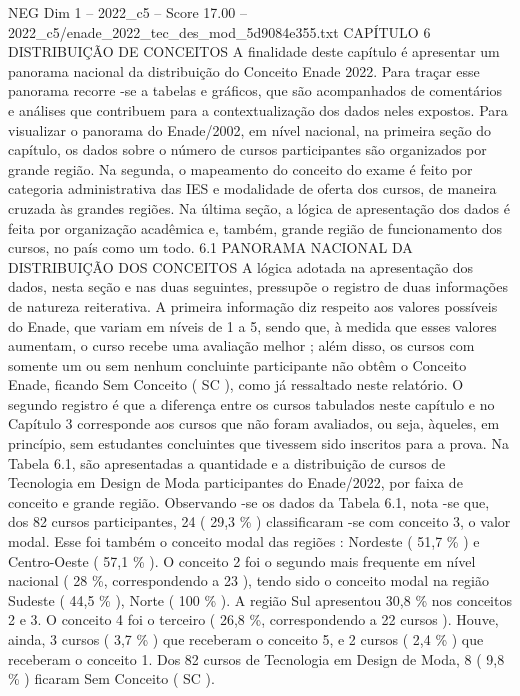 \begin{textsample}{NEG Dim 1 – 2022\_c5 – Score 17.00 – 2022\_c5/enade\_2022\_tec\_des\_mod\_5d9084e355.txt}  \label{ex:f1_neg_415}
CAPÍTULO 6 DISTRIBUIÇÃO DE CONCEITOS A finalidade deste capítulo é apresentar um panorama nacional da distribuição do Conceito Enade 2022.
Para traçar esse panorama recorre -se a tabelas e gráficos, que são acompanhados de comentários e análises que contribuem para a contextualização dos dados neles expostos.
Para visualizar o panorama do Enade/2002, em nível nacional, na primeira seção do capítulo, os dados sobre o número de cursos participantes são organizados por grande região.
Na segunda, o mapeamento do conceito do exame é feito por categoria administrativa das IES e modalidade de oferta dos cursos, de maneira cruzada às grandes regiões.
Na última seção, a lógica de apresentação dos dados é feita por organização acadêmica e, também, grande região de funcionamento dos cursos, no país como um todo. 6.1 PANORAMA NACIONAL DA DISTRIBUIÇÃO DOS CONCEITOS A lógica adotada na apresentação dos dados, nesta seção e nas duas seguintes, pressupõe o registro de duas informações de natureza reiterativa.
A primeira informação diz respeito aos valores possíveis do Enade, que variam em níveis de 1 a 5, sendo que, à medida que esses valores aumentam, o curso recebe uma avaliação melhor ; além disso, os cursos com somente um ou sem nenhum concluinte participante não obtêm o Conceito Enade, ficando Sem Conceito ( SC ), como já ressaltado neste relatório.
O segundo registro é que a diferença entre os cursos tabulados neste capítulo e no Capítulo 3 corresponde aos cursos que não foram avaliados, ou seja, àqueles, em princípio, sem estudantes concluintes que tivessem sido inscritos para a prova.
Na Tabela 6.1, são apresentadas a quantidade e a distribuição de cursos de Tecnologia em Design de Moda participantes do Enade/2022, por faixa de conceito e grande região.
Observando -se os dados da Tabela 6.1, nota -se que, dos 82 cursos participantes, 24 ( 29,3 \% ) classificaram -se com conceito 3, o valor modal.
Esse foi também o conceito modal das regiões : Nordeste ( 51,7 \% ) e Centro-Oeste ( 57,1 \% ).
O conceito 2 foi o segundo mais frequente em nível nacional ( 28 \%, correspondendo a 23 ), tendo sido o conceito modal na região Sudeste ( 44,5 \% ), Norte ( 100 \% ).
A região Sul apresentou 30,8 \% nos conceitos 2 e 3.
O conceito 4 foi o terceiro ( 26,8 \%, correspondendo a 22 cursos ).
Houve, ainda, 3 cursos ( 3,7 \% ) que receberam o conceito 5, e 2 cursos ( 2,4 \% ) que receberam o conceito 1.
Dos 82 cursos de Tecnologia em Design de Moda, 8 ( 9,8 \% ) ficaram Sem Conceito ( SC ).

\end{textsample}
